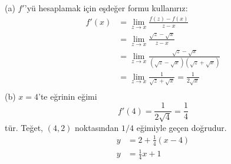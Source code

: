 \begin{cozum}
(a) $f'$'yü hesaplamak için eşdeğer formu kullanırız:
\begin{equation*}
\begin{split}
		f'(x)  & =\lim_{z \rightarrow x}\frac{f(z)-f(x)}{z-x}\\
		        & =\lim_{z \rightarrow x}\frac{\sqrt{z}-\sqrt{x}}{z-x}\\
		        & =\lim_{z \rightarrow x}\frac{\sqrt{z}-\sqrt{x}}{(\sqrt{z}-\sqrt{x})(\sqrt{z}+\sqrt{x})}\\
		        & =\lim_{z \rightarrow x}\frac{1}{\sqrt{z}+\sqrt{x}}=\frac{1}{2\sqrt{x}}\\
\end{split}
\end{equation*}
(b) $x=4$'te eğrinin eğimi
\begin{equation*}
	f'(4)=\frac{1}{2\sqrt{4}}=\frac{1}{4}
\end{equation*}
tür. Teğet, $(4,2)$ noktasından $1/4$ eğimiyle geçen doğrudur.\\
\begin{equation*}
\begin{split}
	 y &= 2 + \frac{1}{4}(x-4)\\
	 y &= \frac{1}{4}x + 1\\
\end{split}
\end{equation*}
\end{cozum}
